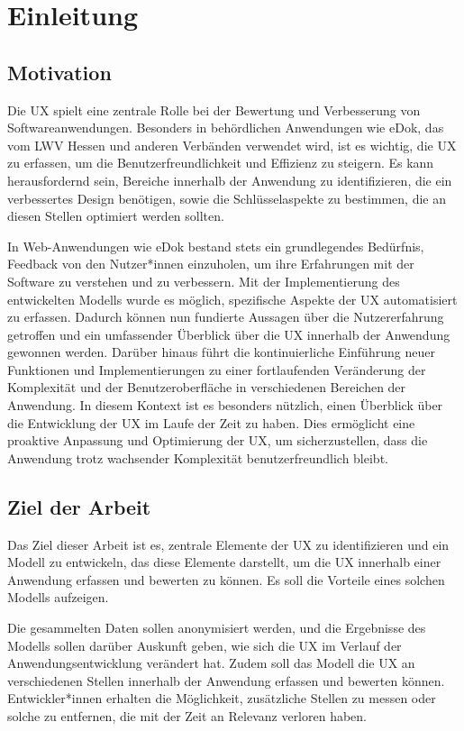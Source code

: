 \documentclass[a4paper,12pt]{report}
\begin{document}
\chapter{Einleitung}
\section{Motivation}
Die UX spielt eine zentrale Rolle bei der Bewertung und Verbesserung von Softwareanwendungen. Besonders in behördlichen Anwendungen wie eDok, das vom LWV Hessen und anderen Verbänden verwendet wird, ist es wichtig, die UX zu erfassen, um die Benutzerfreundlichkeit und Effizienz zu steigern. Es kann herausfordernd sein, Bereiche innerhalb der Anwendung zu identifizieren, die ein verbessertes Design benötigen, sowie die Schlüsselaspekte zu bestimmen, die an diesen Stellen optimiert werden sollten.

In Web-Anwendungen wie eDok bestand stets ein grundlegendes Bedürfnis, Feedback von den Nutzer*innen einzuholen, um ihre Erfahrungen mit der Software zu verstehen und zu verbessern. Mit der Implementierung des entwickelten Modells wurde es möglich, spezifische Aspekte der UX automatisiert zu erfassen. Dadurch können nun fundierte Aussagen über die Nutzererfahrung getroffen und ein umfassender Überblick über die UX innerhalb der Anwendung gewonnen werden. Darüber hinaus führt die kontinuierliche Einführung neuer Funktionen und Implementierungen zu einer fortlaufenden Veränderung der Komplexität und der Benutzeroberfläche in verschiedenen Bereichen der Anwendung. In diesem Kontext ist es besonders nützlich, einen Überblick über die Entwicklung der UX im Laufe der Zeit zu haben. Dies ermöglicht eine proaktive Anpassung und Optimierung der UX, um sicherzustellen, dass die Anwendung trotz wachsender Komplexität benutzerfreundlich bleibt.

\section{Ziel der Arbeit}
Das Ziel dieser Arbeit ist es, zentrale Elemente der UX zu identifizieren und ein Modell zu entwickeln, das diese Elemente darstellt, um die UX innerhalb einer Anwendung erfassen und bewerten zu können. Es soll die Vorteile eines solchen Modells aufzeigen.

Die gesammelten Daten sollen anonymisiert werden, und die Ergebnisse des Modells sollen darüber Auskunft geben, wie sich die UX im Verlauf der Anwendungsentwicklung verändert hat. Zudem soll das Modell die UX an verschiedenen Stellen innerhalb der Anwendung erfassen und bewerten können. Entwickler*innen erhalten die Möglichkeit, zusätzliche Stellen zu messen oder solche zu entfernen, die mit der Zeit an Relevanz verloren haben.
\end{document}
